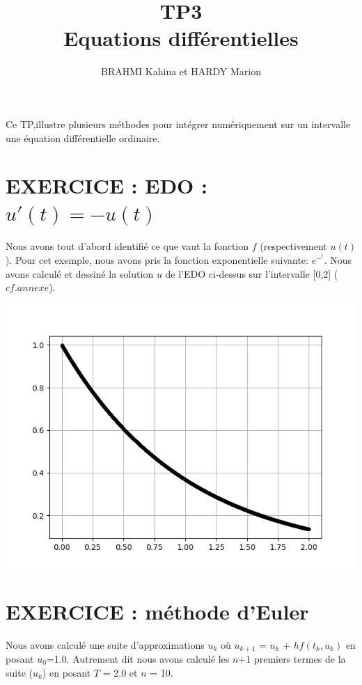\documentclass{article}
\title{TP3\\ Equations différentielles}
\author{BRAHMI Kahina et HARDY Marion}
\begin{document}
\maketitle

	Ce TP,illustre plusieurs méthodes pour intégrer numériquement sur un intervalle une équation différentielle ordinaire.

\section{EXERCICE : EDO : $u'(t)=-u(t)$}

Nous avons tout d'abord identifié ce que vaut la fonction $f$ (respectivement $u(t)$). Pour cet exemple, nous avons pris la fonction exponentielle suivante: $e^-^t$. Nous avons calculé et dessiné la solution $u$ de l'EDO ci-dessus sur l'intervalle [0,2] ($cf.annexe$).

\begin{center}
	\includegraphics[scale=0.5]{graph2.png}
\end{center}

\newpage

\section{EXERCICE : méthode d'Euler}

Nous avons calculé une suite d'approximations $u_{k}$ où $u_{k+1}$ = $u_{k}$ + $hf(t_{k},u_{k})$ en posant $u_{0}$=1.0. Autrement dit nous avons calculé les $n$+1 premiers termes de la suite ($u_{k}$) en posant $T$ = 2.0 et $n$ = 10. 
\end{document}
